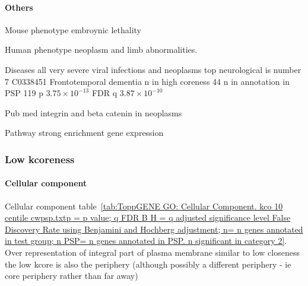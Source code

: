 \paragraph{Others}
Mouse phenotype embroynic lethality

Human phenotype neoplasm and limb abnormalities. 

Diseases all very severe viral infections and neoplasms top neurological is number 7 C0338451  Frontotemporal dementia n in high coreness 44 n in annotation in PSP 119 p $3.75 \times 10^{-13}$ FDR q $3.87 \times 10^{-10}$  

Pub med integrin and beta catenin in neoplasms

Pathway strong enrichment gene expression
\clearpage
\subsubsection{Low kcoreness}

\paragraph{Cellular component}
Cellular component table~\ref{tab:ToppGENE GO: Cellular Component. kco 10 centile cwpsp.txtp = p value; q FDR B H = q adjusted significance level False Discovery Rate using Benjamini and Hochberg adjustment; n= n genes annotated in test group; n PSP= n genes annotated in PSP. n significant in category 2}. Over representation of integral part of plasma membrane similar to low closeness the low kcore is also the periphery (although possibly a different periphery - ie core periphery rather than far away)


